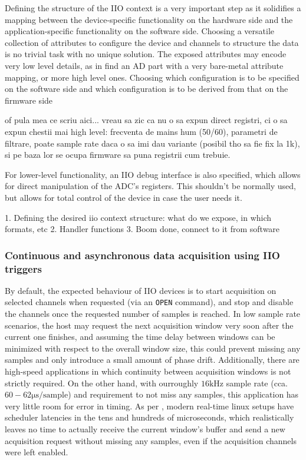 \documentclass{thesis}
\newcommand{\our}{our}
\newcommand{\kHz}{\unit{\kilo\hertz}}
\newcommand{\us}{\unit{\micro\second}}
\begin{document}
Defining the structure of the IIO context is a very important step as it solidifies a mapping between the device-specific functionality on the hardware side and the application-specific functionality on the software side. Choosing a versatile collection of attributes to configure the device and channels to structure the data is no trivial task with no unique solution. The exposed attributes may encode very low level details, as in {find an AD part with a very bare-metal attribute mapping}, or more high level ones. Choosing which configuration is to be specified on the software side and which configuration is to be derived from that on the firmware side {of pula mea ce scriu aici... vreau sa zic ca nu o sa expun direct registri, ci o sa expun chestii mai high level: frecventa de mains hum (50/60), parametri de filtrare, poate sample rate daca o sa imi dau variante (posibil tho sa fie fix la 1k), si pe baza lor se ocupa firmware sa puna registrii cum trebuie.

For lower-level functionality, an IIO debug interface is also specified, which allows for direct manipulation of the ADC's registers. This shouldn't be normally used, but allows for total control of the device in case the user needs it.

1. Defining the desired iio context structure: what do we expose, in which formats, etc
2. Handler functions
3. Boom done, connect to it from software

\subsubsection{Continuous and asynchronous data acquisition using IIO triggers}

By default, the expected behaviour of IIO devices is to start acquisition on selected channels when requested (via an \texttt{OPEN} command), and stop and disable the channels once the requested number of samples is reached. In low sample rate scenarios, the host may request the next acquisition window very soon after the current one finishes, and assuming the time delay between windows can be minimized with respect to the overall window size, this could prevent missing any samples and only introduce a small amount of phase drift. Additionally, there are high-speed applications in which continuity between acquisition windows is not strictly required. On the other hand, with \our roughly $16\kHz$ sample rate (cca. $60 - 62\us/\text{sample}$) and requirement to not miss any samples, this application has very little room for error in timing. As per \cite{linuxlatency}, modern real-time linux setups have scheduler latencies in the tens and hundreds of microseconds, which realistically leaves no time to actually receive the current window's buffer and send a new acquisition request without missing any samples, even if the acquisition channels were left enabled.

}
\end{document}
